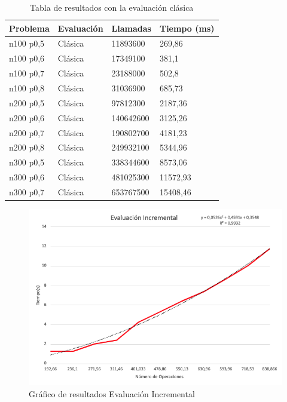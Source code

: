 \documentclass[oneside,onecolumn]{article}
\begin{document}
\begin{table}[h]
  \caption{Tabla de resultados con la evaluación clásica}
  \centering
  \begin{tabular}{|l|l|l|l|}
    \hline
    Problema  & Evaluación & Llamadas  & Tiempo (ms) \\ \hline
    n100 p0,5 & Clásica    & 11893600  & 269,86      \\ \hline
    n100 p0,6 & Clásica    & 17349100  & 381,1       \\ \hline
    n100 p0,7 & Clásica    & 23188000  & 502,8       \\ \hline
    n100 p0,8 & Clásica    & 31036900  & 685,73      \\ \hline
    n200 p0,5 & Clásica    & 97812300  & 2187,36     \\ \hline
    n200 p0,6 & Clásica    & 140642600 & 3125,26     \\ \hline
    n200 p0,7 & Clásica    & 190802700 & 4181,23     \\ \hline
    n200 p0,8 & Clásica    & 249932100 & 5344,96     \\ \hline
    n300 p0,5 & Clásica    & 338344600 & 8573,06     \\ \hline
    n300 p0,6 & Clásica    & 481025300 & 11572,93    \\ \hline
    n300 p0,7 & Clásica    & 653767500 & 15408,46    \\ \hline
  \end{tabular}
\end{table}

\newpage

\begin{figure}[h]
  \centering
  \includegraphics[scale=0.52]{graficos/eval_incr.png}
  \caption{Gráfico de resultados Evaluación Incremental}
\end{figure}
\end{document}
